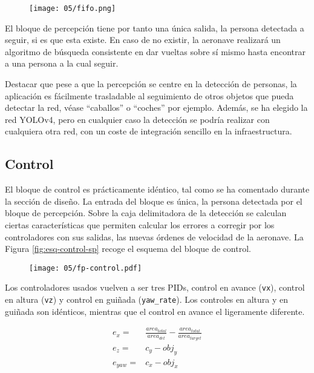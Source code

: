 \documentclass[../main.tex]{subfiles}
\begin{document}
\begin{figure}[!ht]
 	{\texttt{[image: 05/fifo.png]}}
\end{figure}

El bloque de percepción tiene por tanto una única salida, la persona detectada a seguir, si es que esta existe. En caso de no existir, la aeronave realizará un algoritmo de búsqueda consistente en dar vueltas sobre sí mismo hasta encontrar a una persona a la cual seguir.

Destacar que pese a que la percepción se centre en la detección de personas, la aplicación es fácilmente trasladable al seguimiento de otros objetos que pueda detectar la red, véase ``caballos'' o ``coches'' por ejemplo. Además, se ha elegido la red YOLOv4, pero en cualquier caso la detección se podría realizar con cualquiera otra red, con un coste de integración sencillo en la infraestructura.

\subsection*{Control}
El bloque de control es prácticamente idéntico, tal como se ha comentado durante la sección de diseño. La entrada del bloque es única, la persona detectada por el bloque de percepción. Sobre la caja delimitadora de la detección se calculan ciertas características que permiten calcular los errores a corregir por los controladores con sus salidas, las nuevas órdenes de velocidad de la aeronave. La Figura \ref{fig:esq-control-sp} recoge el esquema del bloque de control.

\begin{figure}[!ht]
 	{\texttt{[image: 05/fp-control.pdf]}}
\end{figure}

Los controladores usados vuelven a ser tres PIDs, control en avance (\lstinline{vx}), control en altura (\lstinline{vz}) y control en guiñada (\lstinline{yaw_rate}). Los controles en altura y en guiñada son idénticos, mientras que el control en avance el ligeramente diferente. 

\begin{align}
    e_x = & \frac{area_{total}}{area_{det}} - \frac{area_{total}}{area_{target}} \label{eq:ex2} \\
    e_z = & c_y - obj_y \label{eq:ez2} \\
    e_{yaw} = & c_x - obj_x \label{eq:eyaw2}
\end{align}
\end{document}
